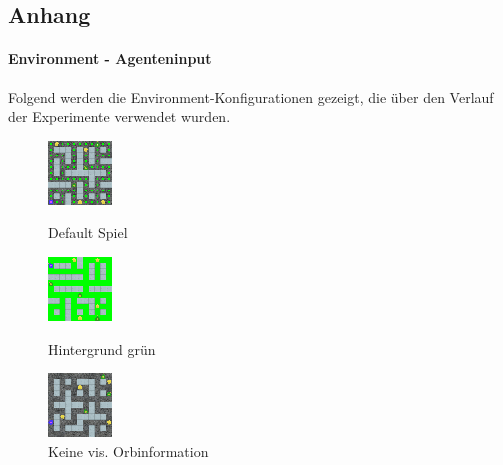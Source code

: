 \subsection*{Anhang}\label{anhang}
\setcounter{page}{1}
\paragraph{Environment - Agenteninput}\label{anh_env_bilder_chaser} \hfill \break
Folgend werden die Environment-Konfigurationen gezeigt, die über den Verlauf der Experimente verwendet wurden.
\begin{figure}[htb!]
   \captionsetup{width=0.30\linewidth} 

    \begin{minipage}{0.3\linewidth}
        \centering
        \includegraphics[scale=1.2]{abb/_envpics/example_green}
        \caption*{Default Spiel}
        \label{fig:pic_chaser_defautl}
    \end{minipage}
    \begin{minipage}{0.3\linewidth}
        \centering
        \includegraphics[scale=1.2]{abb/_envpics/example_greenBG}
        \caption*{Hintergrund grün}
        \label{fig:pic_chaser_greenBG}
    \end{minipage}
    \begin{minipage}{0.3\linewidth}
        \centering
        \includegraphics[scale=1.2]{abb/_envpics/example_noVisOrb}
        \caption*{Keine vis. Orbinformation}
        \label{fig:pic_chaser_noVisOrb}
    \end{minipage}
\end{figure}

